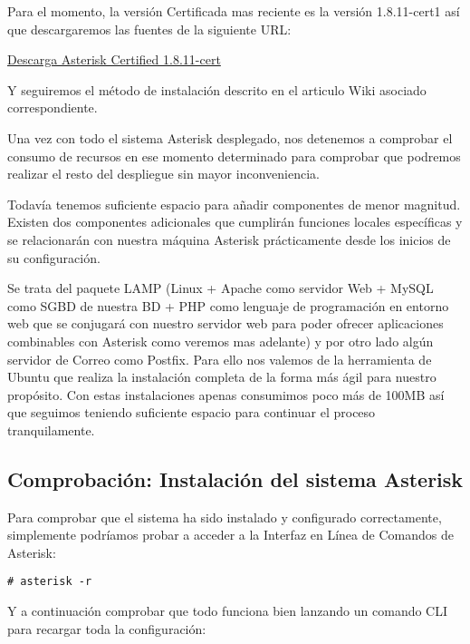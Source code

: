 Para el momento, la versión Certificada mas reciente es la versión 1.8.11-cert1 así que descargaremos las fuentes de la siguiente URL:

\href{http://downloads.asterisk.org/pub/telephony/certified-asterisk/releases/certified-asterisk-1.8.11-cert1.tar.gz}{Descarga Asterisk Certified 1.8.11-cert}

Y seguiremos el método de instalación descrito en el articulo Wiki asociado correspondiente.

Una vez con todo el sistema Asterisk desplegado, nos detenemos a comprobar el consumo de recursos en ese momento determinado para comprobar que podremos realizar el resto del despliegue sin mayor inconveniencia.


Todavía tenemos suficiente espacio para añadir componentes de menor magnitud. Existen dos componentes adicionales que cumplirán funciones locales específicas y se relacionarán con nuestra máquina Asterisk prácticamente desde los inicios de su configuración. 

Se trata del paquete LAMP (Linux + Apache como servidor Web + MySQL como SGBD de nuestra BD + PHP como lenguaje de programación en entorno web que se conjugará con nuestro servidor web para poder ofrecer aplicaciones combinables con Asterisk como veremos mas adelante) y por otro lado algún servidor de Correo como Postfix. Para ello nos valemos de la herramienta  de Ubuntu que realiza la instalación completa de la forma más ágil para nuestro propósito. Con estas instalaciones apenas consumimos poco más de 100MB así que seguimos teniendo suficiente espacio para continuar el proceso tranquilamente.

\subsection{Comprobación: Instalación del sistema Asterisk}

Para comprobar que el sistema ha sido instalado y configurado correctamente, simplemente podríamos probar a acceder a la Interfaz en Línea de Comandos de Asterisk:

\begin{lstlisting}[style=consola]
# asterisk -r
\end{lstlisting}

Y a continuación comprobar que todo funciona bien lanzando un comando CLI para recargar toda la configuración:

